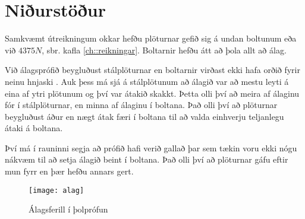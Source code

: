 
\section{Niðurstöður}
\label{sec:nidurstodur}

Samkvæmt útreikningum okkar hefðu plöturnar gefið sig á undan boltunum eða við $4375 N$, sbr. kafla \ref{ch::reikningar}.
Boltarnir hefðu átt að þola allt að  álag.


Við álagsprófið beygluðust stálplöturnar en boltarnir virðast ekki hafa orðið fyrir neinu hnjaski .
Auk þess má sjá á stálplötunum að álagið var að mestu leyti á eina af ytri plötunum og því var átakið skakkt. Þetta olli því að meira af álaginu fór í stálplöturnar, en minna af álaginu í boltana. 
Það olli því að plöturnar beygluðust áður en nægt átak færi í boltana til að valda einhverju teljanlegu átaki á boltana.

Því má í rauninni segja að prófið hafi verið gallað þar sem tækin voru ekki nógu nákvæm til að setja álagið beint í boltana. Það olli því að plöturnar gáfu eftir mun fyrr en þær hefðu annars gert.

\begin{figure}[b]
  \centering
  \texttt{[image: alag]}
  \caption{Álagsferill í þolprófun}
  \label{fig:alag}
\end{figure}